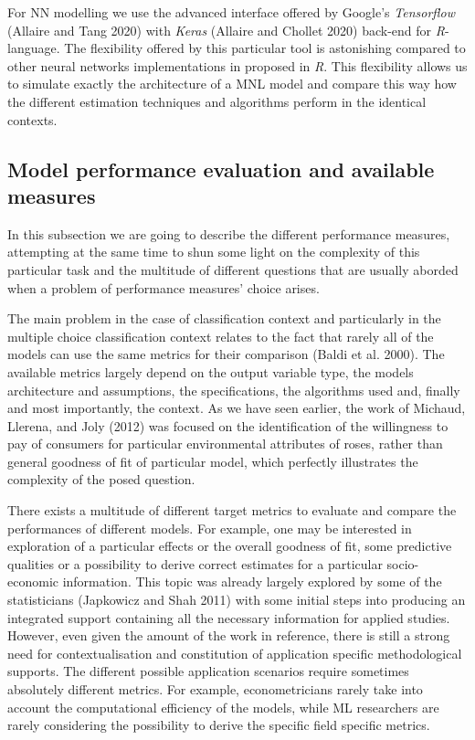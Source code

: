 \documentclass[12pt,]{article}
\begin{document}
For NN modelling we use the advanced interface offered by Google's
\emph{Tensorflow} (Allaire and Tang 2020) with \emph{Keras} (Allaire and
Chollet 2020) back-end for \emph{R}-language. The flexibility offered by
this particular tool is astonishing compared to other neural networks
implementations in proposed in \emph{R}. This flexibility allows us to
simulate exactly the architecture of a MNL model and compare this way
how the different estimation techniques and algorithms perform in the
identical contexts.

\hypertarget{model-performance-evaluation-and-available-measures}{%
\subsection{Model performance evaluation and available
measures}\label{model-performance-evaluation-and-available-measures}}

In this subsection we are going to describe the different performance
measures, attempting at the same time to shun some light on the
complexity of this particular task and the multitude of different
questions that are usually aborded when a problem of performance
measures' choice arises.

The main problem in the case of classification context and particularly
in the multiple choice classification context relates to the fact that
rarely all of the models can use the same metrics for their comparison
(Baldi et al. 2000). The available metrics largely depend on the output
variable type, the models architecture and assumptions, the
specifications, the algorithms used and, finally and most importantly,
the context. As we have seen earlier, the work of Michaud, Llerena, and
Joly (2012) was focused on the identification of the willingness to pay
of consumers for particular environmental attributes of roses, rather
than general goodness of fit of particular model, which perfectly
illustrates the complexity of the posed question.

There exists a multitude of different target metrics to evaluate and
compare the performances of different models. For example, one may be
interested in exploration of a particular effects or the overall
goodness of fit, some predictive qualities or a possibility to derive
correct estimates for a particular socio-economic information. This
topic was already largely explored by some of the statisticians
(Japkowicz and Shah 2011) with some initial steps into producing an
integrated support containing all the necessary information for applied
studies. However, even given the amount of the work in reference, there
is still a strong need for contextualisation and constitution of
application specific methodological supports. The different possible
application scenarios require sometimes absolutely different metrics.
For example, econometricians rarely take into account the computational
efficiency of the models, while ML researchers are rarely considering
the possibility to derive the specific field specific metrics.
\end{document}
